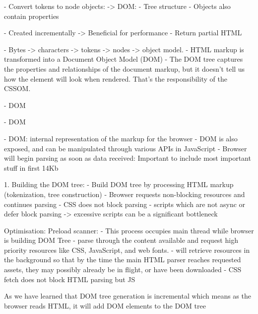 	- Convert tokens to node objects:
		-> DOM:
			- Tree structure
			- Objects also contain properties

		- Created incrementally
		-> Beneficial for performance
		- Return partial HTML


- Bytes -> characters -> tokens -> nodes -> object model.
- HTML markup is transformed into a Document Object Model (DOM)
- The DOM tree captures the properties and relationships of the document markup, but it doesn't tell us how the element will look when rendered. That’s the responsibility of the CSSOM.

- DOM


- DOM




- DOM: internal representation of the markup for the browser
- DOM is also exposed, and can be manipulated through various APIs in JavaScript
- Browser will begin parsing as soon as data received: Important to include most important stuff in first 14Kb

1. Building the DOM tree:
- Build DOM tree by processing HTML markup (tokenization, tree construction)
- Browser requests non-blocking resources and continues parsing
- CSS does not block parsing
- scripts which are not async or defer block parsing -> excessive scripts can be a significant bottleneck

Optimisation: Preload scanner:
- This process occupies main thread while browser is building DOM Tree
- parse through the content available and request high priority resources like CSS, JavaScript, and web fonts.
- will retrieve resources in the background so that by the time the main HTML parser reaches requested assets, they may possibly already be in flight, or have been downloaded
- CSS fetch does not block HTML parsing but JS



As we have learned that DOM tree generation is incremental which means as the browser reads HTML, it will add DOM elements to the DOM tree


